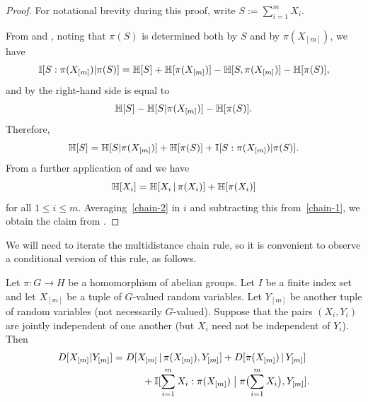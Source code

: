   \begin{proof}\leanok For notational brevity during this proof, write $S := \sum_{i=1}^m X_i$.

    From  and , noting that $\pi(S)$ is determined both by $S$ and by $\pi(X_{[m]})$, we have
  \begin{equation*}
   \mathbb{I}[S:\pi(X_{[m]})|\pi(S)] = \mathbb{H}[S]+\mathbb{H}[\pi(X_{[m]})]-\mathbb{H}[S,\pi(X_{[m]})]-\mathbb{H}[\pi(S)],
  \end{equation*}
  and by  the right-hand side is equal to
  \begin{equation*}
  \mathbb{H}[S]-\mathbb{H}[S|\pi(X_{[m]})]-\mathbb{H}[\pi(S)].
  \end{equation*}
  Therefore,
  \begin{equation}\label{chain-1}
  \mathbb{H}[S]=\mathbb{H}[S|\pi(X_{[m]})]+\mathbb{H}[\pi(S)]+\mathbb{I}[S:\pi(X_{[m]})|\pi(S)]. \end{equation}
  From a further application of  and  we have
  \begin{equation}\label{chain-2}
    \mathbb{H}[X_i] = \mathbb{H}[X_i \, | \, \pi(X_i)] + \mathbb{H}[\pi(X_i)]
  \end{equation}
  for all $1 \leq i \leq m$.  Averaging~\eqref{chain-2} in $i$ and subtracting this from~\eqref{chain-1}, we obtain the claim from .
  \end{proof}

  We will need to iterate the multidistance chain rule, so it is convenient to observe a conditional version of this rule, as follows.

  \begin{lemma}\label{multidist-chain-rule-cond}\leanok
    Let $\pi \colon G \to H$ be a homomorphism of abelian groups.
    Let $I$ be a finite index set and let $X_{[m]}$ be a tuple of $G$-valued random variables.
    Let $Y_{[m]}$ be another tuple of random variables (not necessarily $G$-valued).
    Suppose that the pairs $(X_i, Y_i)$ are jointly independent of one another (but $X_i$ need not be independent of $Y_i$).
    Then
    \begin{align}\nonumber
        D[ X_{[m]} | Y_{[m]} ] &=  D[ X_{[m]} \,|\, \pi(X_{[m]}), Y_{[m]}] + D[ \pi(X_{[m]}) \,|\, Y_{[m]}] \\
         &\quad\qquad + \mathbb{I}[ \sum_{i=1}^m X_i : \pi(X_{[m]}) \; \big| \;  \pi\bigl(\sum_{i=1}^m X_i \bigr), Y_{[m]} ].\label{chain-eq-cond}
    \end{align}
  \end{lemma}

